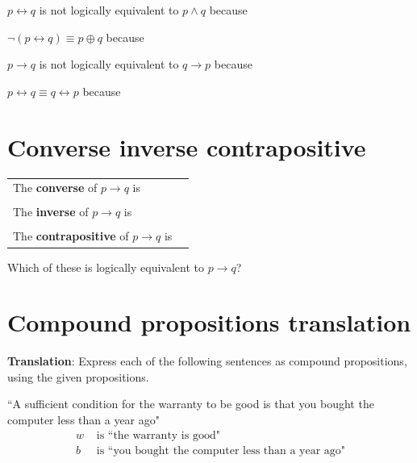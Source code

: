 \documentclass[12pt, oneside]{article}
\begin{document}
    \vfill
    
    $p \leftrightarrow q$ is not logically equivalent to $p \land q$ because \underline{\phantom{\hspace{4in}}} 
    
    \vfill
    
    $\lnot( p \leftrightarrow q) \equiv p \oplus q$ because \underline{\phantom{\hspace{4in}}} 
    
    \vfill
    
    
    $p \to q$ is not logically equivalent to $q \to p$ because \underline{\phantom{\hspace{4in}}} 
    
    \vfill
    
    $p \leftrightarrow q \equiv q \leftrightarrow p$ because \underline{\phantom{\hspace{4in}}} 
    
    \vfill \vfill
\section*{Converse inverse contrapositive}


\begin{tabular}{ll}
    The {\bf  converse}  of $p \to q$ is & \underline{\phantom{\hspace{1.6in}}}\\
    &  \\
    The {\bf  inverse}  of $p \to q$ is  &\underline{\phantom{\hspace{1.6in}}}\\
    &  \\
    The {\bf  contrapositive}  of $p \to q$ is & \underline{\phantom{\hspace{1.6in}}}
    \end{tabular}
    Which of these is logically equivalent to $p \to q$?
    
    \vfill
    \vfill \vfill
\section*{Compound propositions translation}


{\bf Translation}: Express each of the following sentences as compound propositions, using
the given propositions.

\begin{multicols}{2}
``A sufficient condition for the warranty to be good is that you bought the computer less than a year ago"
\columnbreak
\begin{align*}
w &\text{ is  ``the warranty is good"} \\
b &\text{ is  ``you bought the computer less than a year ago"} \\
\end{align*}
\end{multicols}
\vfill
\end{document}
